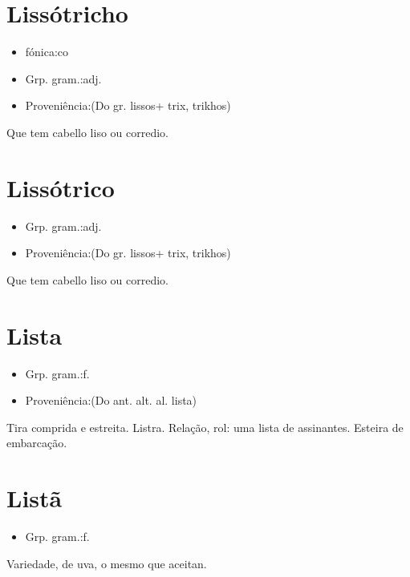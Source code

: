\section{Lissótricho}
\begin{itemize}
\item {fónica:co}
\end{itemize}
\begin{itemize}
\item {Grp. gram.:adj.}
\end{itemize}
\begin{itemize}
\item {Proveniência:(Do gr. \textunderscore lissos\textunderscore  + \textunderscore trix\textunderscore , \textunderscore trikhos\textunderscore )}
\end{itemize}
Que tem cabello liso ou corredio.
\section{Lissótrico}
\begin{itemize}
\item {Grp. gram.:adj.}
\end{itemize}
\begin{itemize}
\item {Proveniência:(Do gr. \textunderscore lissos\textunderscore  + \textunderscore trix\textunderscore , \textunderscore trikhos\textunderscore )}
\end{itemize}
Que tem cabello liso ou corredio.
\section{Lista}
\begin{itemize}
\item {Grp. gram.:f.}
\end{itemize}
\begin{itemize}
\item {Proveniência:(Do ant. alt. al. \textunderscore lista\textunderscore )}
\end{itemize}
Tira comprida e estreita.
Listra.
Relação, rol: \textunderscore uma lista de assinantes\textunderscore .
Esteira de embarcação.
\section{Listã}
\begin{itemize}
\item {Grp. gram.:f.}
\end{itemize}
Variedade, de uva, o mesmo que \textunderscore aceitan\textunderscore .
